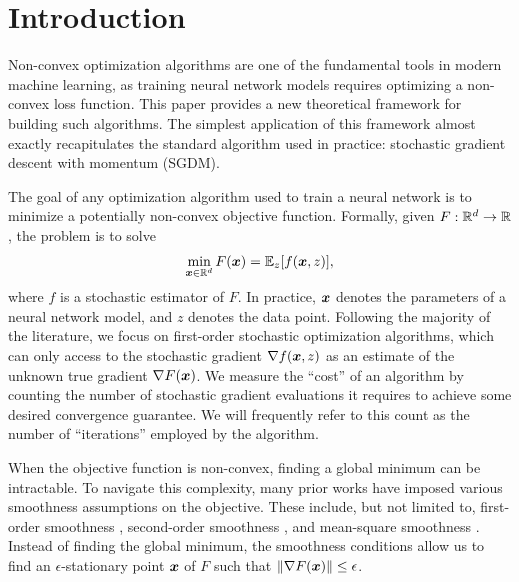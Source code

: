 \section{Introduction}

Non-convex optimization algorithms are one of the fundamental tools in modern machine learning, as training neural network models requires optimizing a non-convex loss function. This paper provides a new theoretical framework for building such algorithms. The simplest application of this framework almost exactly recapitulates the standard algorithm used in practice: stochastic gradient descent with momentum (SGDM).

The goal of any optimization algorithm used to train a neural network is to minimize a potentially non-convex objective function. Formally, given $F:\mathbb R^d\to\mathbb R$, the problem is to solve
\begin{equation*}
    \min_{{\boldsymbol{x}}\in\mathbb R^d} F({\boldsymbol{x}}) = \mathbb{E}_{z}[f({\boldsymbol{x}},z)],
\end{equation*}
where $f$ is a stochastic estimator of $F$. In practice, ${\boldsymbol{x}}$ denotes the parameters of a neural network model, and $z$ denotes the data point. Following the majority of the literature, we focus on first-order stochastic optimization algorithms, which can only access to the stochastic gradient $\nabla f({\boldsymbol{x}},z)$ as an estimate of the unknown true gradient $\nabla F({\boldsymbol{x}})$. We measure the ``cost'' of an algorithm by counting the number of stochastic gradient evaluations it requires to achieve some desired convergence guarantee. We will frequently refer to this count as the number of ``iterations'' employed by the algorithm.

When the objective function is non-convex, finding a global minimum can be intractable. To navigate this complexity, many prior works have imposed various smoothness assumptions on the objective. These include, but not limited to, first-order smoothness \cite{ghadimi2013stochastic, carmon2017convex, arjevani2022lower, carmon2019lower}, second-order smoothness \cite{tripuraneni2018stochastic, carmon2018accelerated, fang2019sharp, arjevani2020second}, and mean-square smoothness \cite{allenzhu2018natasha, fang2018spider, cutkosky2019momentum, arjevani2022lower}. Instead of finding the global minimum, the smoothness conditions allow us to find an $\epsilon$-stationary point ${\boldsymbol{x}}$ of $F$ such that $\|\nabla F({\boldsymbol{x}})\|\le\epsilon$.

